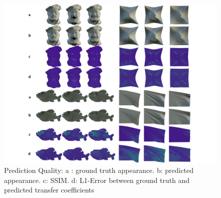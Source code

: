 \begin{figure}
  \centering
    \includegraphics[width=0.7\paperwidth]{Figures/DPRT_quality_SSIM.pdf}
     \caption{Prediction Quality:
     a : ground truth appearance. b: predicted appearance. c: SSIM. d: L1-Error between ground truth and predicted transfer coefficients }
     \label{Fig: DPRT_Quality}
\end{figure}